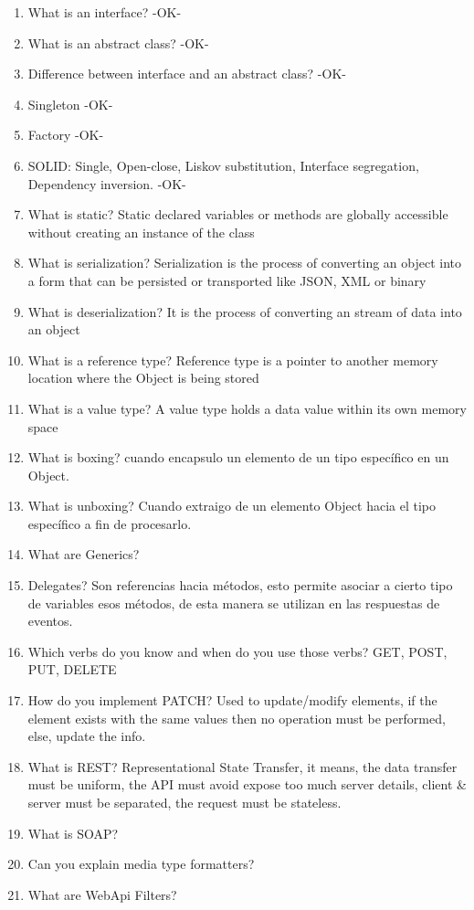\begin{multicols}{2}
\begin{enumerate}
\item What is an interface? -OK-
\item What is an abstract class? -OK-
\item Difference between interface and an abstract class? -OK-
\item Singleton -OK-
\item Factory -OK-
\item SOLID: Single, Open-close, Liskov substitution, Interface segregation, Dependency inversion. -OK-
\item What is static? Static declared variables or methods are globally accessible without creating an instance of the class
\item What is serialization? Serialization is the process of converting an object into a form that can be persisted or transported like JSON, XML or binary
\item What is deserialization? It is the process of converting an stream of data into an object
\item What is a reference type? Reference type is a pointer to another memory location where the Object is being stored
\item What is a value type? A value type holds a data value within its own memory space
\item What is boxing? cuando encapsulo un elemento de un tipo específico en un Object.
\item What is unboxing? Cuando extraigo de un elemento Object hacia el tipo específico a fin de procesarlo.
\item What are Generics? 
\item Delegates? Son referencias hacia métodos, esto permite asociar a cierto tipo de variables esos métodos, de esta manera se utilizan en las respuestas de eventos.
\item Which verbs do you know and when do you use those verbs? GET, POST, PUT, DELETE
\item How do you implement PATCH? Used to update/modify elements, if the element exists with the same values then no operation must be performed, else, update the info.
\item What is REST? Representational State Transfer, it means, the data transfer must be uniform, the API must avoid expose too much server details, client \& server must be separated, the request must be stateless.
\item What is SOAP?
\item Can you explain media type formatters?
\item What are WebApi Filters?

\end{enumerate}
\end{multicols}
